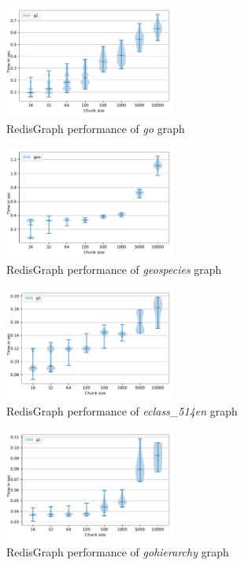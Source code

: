 \begin{figure}[h]
\centering
\includegraphics[width=0.5\textwidth]{data/raw_redis/go.pdf}
\caption{RedisGraph performance of \textit{go} graph}
\label{fig:redis_go_all}
\end{figure}

\begin{figure}[h]
\centering
\includegraphics[width=0.5\textwidth]{data/raw_redis/geospecies.pdf}
\caption{RedisGraph performance of \textit{geospecies} graph}
\label{fig:redis_geospecies_all}
\end{figure}

\begin{figure}[h]
\centering
\includegraphics[width=0.5\textwidth]{data/raw_redis/eclass_514en.pdf}
\caption{RedisGraph performance of \textit{eclass\_514en} graph}
\label{fig:redis_eclass_all}
\end{figure}

\begin{figure}[h]
\centering
\includegraphics[width=0.5\textwidth]{data/raw_redis/gohierarchy.pdf}
\caption{RedisGraph performance of \textit{gohierarchy} graph}
\label{fig:redis_gohierarchy_all}
\end{figure}

